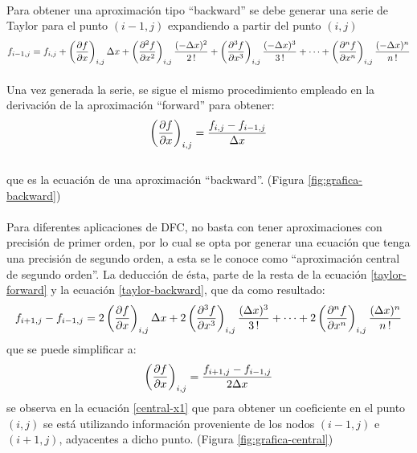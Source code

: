 \documentclass[letterpaper, openright, 12pt]{book}
\begin{document}
	\paragraph*{}
	Para obtener una aproximación tipo ``backward'' se debe generar una serie de Taylor para el punto $(i-1, j)$ expandiendo a partir del punto $(i, j)$
	\begin{equation}
	f_{i-1, j} = f_{i,j} + \left( \pdv{f}{x}\right)_{i,j} \Delta x + \left( \pdv[2]{f}{x} \right)_{i,j} \frac{(-\Delta x)^2 }{2\,!}  + \left( \pdv[3]{f}{x} \right)_{i,j} \frac{(-\Delta x)^3}{3\,!} + \dotsb + \left( \pdv[n]{f}{x} \right)_{i,j} \frac{(-\Delta x)^n}{n\,!}
	\label{taylor-backward}
	\end{equation}
	\paragraph{}
	Una vez generada la serie, se sigue el mismo procedimiento empleado en la derivación de la aproximación ``forward'' para obtener:
	\begin{equation}
	\left( \pdv{f}{x} \right)_{i,j} = \frac{f_{i,j} - f_{i-1,j}}{\Delta x}
	\label{backward-x1}
	\end{equation}
	\\que es la ecuación de una aproximación ``backward''. (Figura \ref{fig:grafica-backward})
	
	\paragraph*{}
	Para diferentes aplicaciones de DFC, no basta con tener aproximaciones con precisión de primer orden, por lo cual se opta por generar una ecuación que tenga una precisión de segundo orden, a esta se le conoce como ``aproximación central de segundo orden''. La deducción de ésta, parte de la resta de la ecuación \ref{taylor-forward} y la ecuación \ref{taylor-backward}, que da como resultado:
	\begin{equation}
	f_{i+1,j} - f_{i-1, j} = 2 \left( \pdv{f}{x} \right)_{i,j} \Delta x + 2 \left( \pdv[3]{f}{x} \right)_{i,j} \frac{(\Delta x)^3}{3 \,!} + \dotsb + 2 \left( \pdv[n]{f}{x} \right)_{i,j} \frac{(\Delta x)^n}{n\,!}
	\end{equation}
	que se puede simplificar a:\\
	\begin{equation}
	\left( \pdv{f}{x} \right)_{i,j} = \frac{f_{i+1,j} - f_{i-1,j}}{2 \Delta x}
	\label{central-x1}
	\end{equation}
	se observa en la ecuación \ref{central-x1} que para obtener un coeficiente en el punto $(i,j)$ se está utilizando información proveniente de los nodos $(i-1, j)$ e $(i+1, j)$, adyacentes a dicho punto. (Figura \ref{fig:grafica-central})
	
\end{document}
